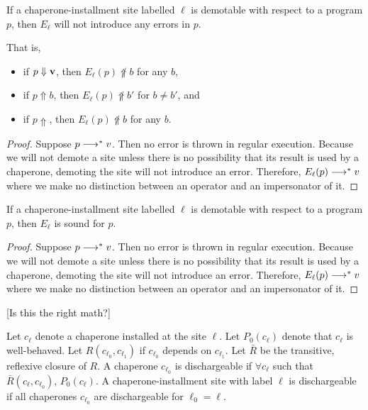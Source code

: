 \begin{lemma}
If a chaperone-installment site labelled $\ell$ is demotable with respect to a program $p$, then $E_\ell$ will not introduce any errors in $p$.

That is,
\begin{itemize}
\item if $p\Downarrow\mathbf{v}$, then $E_\ell(p)\not\Uparrow b$ for any $b$,
\item if $p\Uparrow b$, then $E_\ell(p)\not\Uparrow b'$ for $b\ne b'$, and
\item if $p\Uparrow$, then $E_\ell(p)\not\Uparrow b$ for any $b$.
\end{itemize}
\end{lemma}

\begin{proof}
Suppose $p\longrightarrow^{*} v$.
Then no error is thrown in regular execution.
Because we will not demote a site unless there is no possibility that its result is used by a chaperone, demoting the site will not introduce an error.
Therefore, $E_\ell(p)\longrightarrow^{*} v$ where we make no distinction between an operator and an impersonator of it.

\end{proof}

\begin{theorem}
If a chaperone-installment site labelled $\ell$ is demotable with respect to a program $p$, then $E_\ell$ is sound for $p$.
\end{theorem}

\begin{proof}
Suppose $p\longrightarrow^{*} v$.
Then no error is thrown in regular execution.
Because we will not demote a site unless there is no possibility that its result is used by a chaperone, demoting the site will not introduce an error.
Therefore, $E_\ell(p)\longrightarrow^{*} v$ where we make no distinction between an operator and an impersonator of it.


\end{proof}

[Is this the right math?]

Let $c_\ell$ denote a chaperone installed at the site $\ell$.
Let $P_0(c_\ell)$ denote that $c_\ell$ is well-behaved.
Let $R(c_{\ell_0},c_{\ell_1})$ if $c_{\ell_0}$ depends on $c_{\ell_1}$.
Let $\bar{R}$ be the transitive, reflexive closure of $R$.
A chaperone $c_{\ell_0}$ is dischargeable if $\forall c_\ell$ such that $\bar{R}(c_\ell,c_{\ell_0})$, $P_0(c_\ell)$.
A chaperone-installment site with label $\ell$ is dischargeable if all chaperones $c_{\ell_0}$ are dischargeable for $\ell_0=\ell$.

